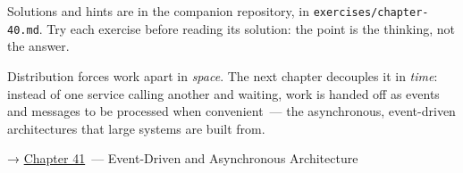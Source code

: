 \noindent{}Solutions and hints are in the companion repository, in \texttt{exercises/}\allowbreak{}\texttt{chapter-40.md}. Try each exercise before reading its solution: the point is the thinking, not the answer.

\label{40-distributed-systems:whats-next}

Distribution forces work apart in \emph{space}. The next chapter decouples it in \emph{time}: instead of one service calling another and waiting, work is handed off as events and messages to be processed when convenient~--- the asynchronous, event-driven architectures that large systems are built from.

\noindent{}→ \hyperref[ch:41-event-driven-architecture]{Chapter 41}~--- Event-Driven and Asynchronous Architecture
